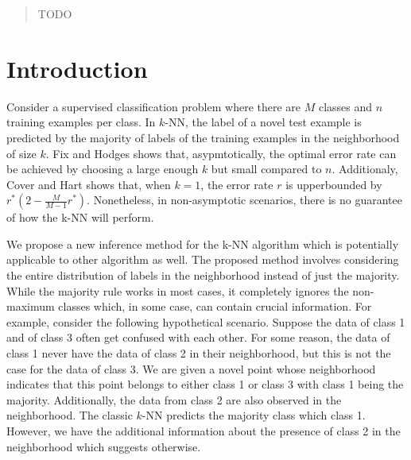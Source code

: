 \documentclass{article}
\begin{document}
 


\begin{abstract} 
TODO
\end{abstract} 

\section{Introduction}
\label{sec:intro}

Consider a supervised classification problem where there are $M$
classes and $n$ training examples per class. In $k$-NN, the label of a
novel test example is predicted by the majority of labels of the
training examples in the neighborhood of size $k$. Fix and Hodges
shows that, asypmtotically, the optimal error rate can be achieved by choosing a large
enough $k$ but small compared to $n$. Additionaly, Cover and Hart
shows that, when $k = 1$, the error rate $r$ is upperbounded by $r^*(2
- \frac{M}{M-1}r^*)$. Nonetheless, in non-asymptotic scenarios, there
is no guarantee of how the k-NN will perform.

We propose a new inference method for the k-NN algorithm which is
potentially applicable to other algorithm as well. The proposed method
involves considering the entire distribution of labels in the
neighborhood instead of just the majority. While the majority rule
works in most cases, it completely ignores the non-maximum classes which, in some case, can
contain crucial information. For example, consider the following
hypothetical scenario. Suppose the data of class 1 and of class 3
often get confused with each other. For some reason, the data of class
1 never have the data of class 2 in their neighborhood, but this is
not the case for the data of class 3. We are given a novel point whose
neighborhood indicates that this point belongs to either class 1 or
class 3 with class 1 being the majority. Additionally, the data from
class 2 are also observed in the neighborhood. The classic $k$-NN
predicts the majority class which class 1. However, we have the
additional information about the presence of class 2 in the
neighborhood which suggests otherwise.
\end{document}
